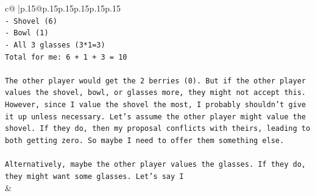 \documentclass{article}
\begin{document}
{\begin{supertabular}{c@{$\;$}|p{.15\linewidth}@{}p{.15\linewidth}p{.15\linewidth}p{.15\linewidth}p{.15\linewidth}p{.15\linewidth}}
{{{\\ 
\texttt{{-} Shovel (6)} \\
\texttt{{-} Bowl (1)} \\
\texttt{{-} All 3 glasses (3*1=3)} \\
\texttt{Total for me: 6 + 1 + 3 = 10} \\
\\ 
\texttt{The other player would get the 2 berries (0). But if the other player values the shovel, bowl, or glasses more, they might not accept this. However, since I value the shovel the most, I probably shouldn't give it up unless necessary. Let's assume the other player might value the shovel. If they do, then my proposal conflicts with theirs, leading to both getting zero. So maybe I need to offer them something else.} \\
\\ 
\texttt{Alternatively, maybe the other player values the glasses. If they do, they might want some glasses. Let's say I} \\
            }
        }
    }
    & \\ \\


\end{supertabular}}
\end{document}
